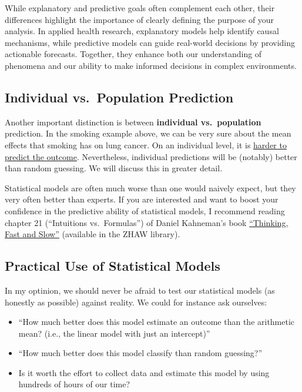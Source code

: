 \documentclass[
]{book}
\begin{document}
While explanatory and predictive goals often complement each other,
their differences highlight the importance of clearly defining the purpose
of your analysis. In applied health research, explanatory models help identify
causal mechanisms, while predictive models can guide real-world decisions by
providing actionable forecasts. Together, they enhance both our understanding
of phenomena and our ability to make informed decisions in complex environments.

\subsection{Individual vs.~Population Prediction}\label{individual-vs.-population-prediction}

Another important distinction is between \textbf{individual vs.~population} prediction.
In the smoking example above, we can be very sure about the mean effects that smoking has on lung cancer.
On an individual level, it is \href{https://www.liebertpub.com/doi/10.1089/rej.2019.2298}{harder to predict the outcome}.
Nevertheless, individual predictions will be (notably) better than random guessing. We will discuss this in greater detail.

Statistical models are often much worse than one would naively expect, but
they very often better than experts. If you are interested and want to
boost your confidence in the predictive ability of statistical models,
I recommend reading chapter 21 (``Intuitions vs.~Formulas'') of Daniel Kahneman's book
\href{https://en.wikipedia.org/wiki/Thinking,_Fast_and_Slow}{``Thinking, Fast and Slow''}
(available in the ZHAW library).

\subsection{Practical Use of Statistical Models}\label{practical-use-of-statistical-models}

In my optinion, we should never be afraid to test our statistical models (as honestly as possible) against reality.
We could for instance ask ourselves:

\begin{itemize}
\item
  ``How much better does this model estimate an outcome than the arithmetic mean?
  (i.e., the linear model with just an intercept)''
\item
  ``How much better does this model classify than random guessing?''
\item
  Is it worth the effort to collect data and estimate this model by using hundreds of hours of our time?
\end{itemize}
\end{document}
